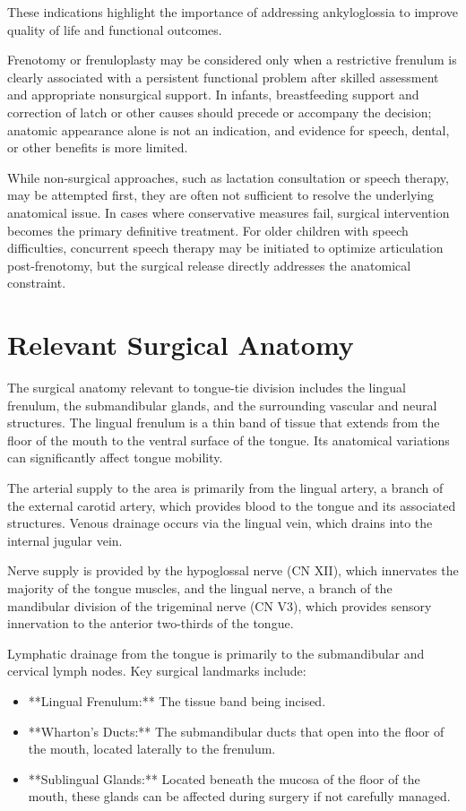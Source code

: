 These indications highlight the importance of addressing ankyloglossia to improve quality of life and functional outcomes.

Frenotomy or frenuloplasty may be considered only when a restrictive frenulum is clearly associated with a persistent functional problem after skilled assessment and appropriate nonsurgical support. In infants, breastfeeding support and correction of latch or other causes should precede or accompany the decision; anatomic appearance alone is not an indication, and evidence for speech, dental, or other benefits is more limited.

While non-surgical approaches, such as lactation consultation or speech therapy, may be attempted first, they are often not sufficient to resolve the underlying anatomical issue. In cases where conservative measures fail, surgical intervention becomes the primary definitive treatment. For older children with speech difficulties, concurrent speech therapy may be initiated to optimize articulation post-frenotomy, but the surgical release directly addresses the anatomical constraint.

\section*{Relevant Surgical Anatomy}
The surgical anatomy relevant to tongue-tie division includes the lingual frenulum, the submandibular glands, and the surrounding vascular and neural structures. The lingual frenulum is a thin band of tissue that extends from the floor of the mouth to the ventral surface of the tongue. Its anatomical variations can significantly affect tongue mobility. 

The arterial supply to the area is primarily from the lingual artery, a branch of the external carotid artery, which provides blood to the tongue and its associated structures. Venous drainage occurs via the lingual vein, which drains into the internal jugular vein. 

Nerve supply is provided by the hypoglossal nerve (CN XII), which innervates the majority of the tongue muscles, and the lingual nerve, a branch of the mandibular division of the trigeminal nerve (CN V3), which provides sensory innervation to the anterior two-thirds of the tongue. 

Lymphatic drainage from the tongue is primarily to the submandibular and cervical lymph nodes. Key surgical landmarks include:

\begin{itemize}
  \item **Lingual Frenulum:** The tissue band being incised.
  \item **Wharton's Ducts:** The submandibular ducts that open into the floor of the mouth, located laterally to the frenulum.
  \item **Sublingual Glands:** Located beneath the mucosa of the floor of the mouth, these glands can be affected during surgery if not carefully managed.
\end{itemize}

